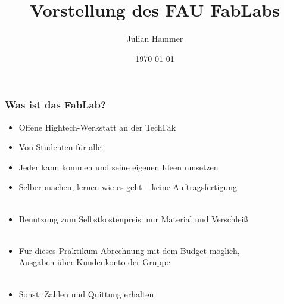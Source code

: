 \documentclass[t]{beamer}
\begin{document}


\date{\today}
\title[Vorstellung]{Vorstellung des FAU FabLabs}
\author{Julian Hammer} %
\frame[plain,c]{\titlepage} %




\begin{frame}
	\frametitle{Was ist das FabLab?}
	\begin{itemize}
		\item Offene Hightech-Werkstatt an der TechFak
		\item Von Studenten für alle
		\item Jeder kann kommen und seine eigenen Ideen umsetzen
		\item Selber machen, lernen wie es geht -- keine Auftragsfertigung\\~
		\item Benutzung zum Selbstkostenpreis: nur Material und Verschleiß\\~
		\item Für dieses Praktikum Abrechnung mit dem Budget möglich,\\
		Ausgaben über Kundenkonto der Gruppe\\~
        \item Sonst: Zahlen und Quittung erhalten
	\end{itemize}

\end{frame}

% 
% 

%	
% 	
%	
\end{document}
